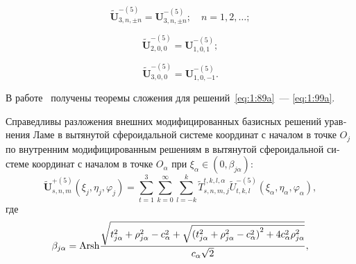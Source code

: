 \begin{russian}
\begin{equation}\label{eq:1:97a}
\mathbf{\tilde U}_{3,n,\pm n}^{-(5)}=\mathbf{U}_{3,n,\pm n}^{-(5)};\quad n=1,2,\dots;
\end{equation}

\begin{equation}\label{eq:1:98a}
\mathbf{\tilde U}_{2,0,0}^{-(5)}=\mathbf{U}_{1,0,1}^{-(5)};
\end{equation}

\begin{equation}\label{eq:1:99a}
\mathbf{\tilde U}_{3,0,0}^{-(5)}=\mathbf{U}_{1,0,-1}^{-(5)}.
\end{equation}

В работе~\cite{Nikolaev2014-1} получены теоремы сложения для решений~\eqref{eq:1:89a}~--- \eqref{eq:1:99a}.

\begin{theorem}
Справедливы разложения внешних модифицированных базисных решений уравнения Ламе в вытянутой сфероидальной системе координат с началом в точке $O_j$ по внутренним модифицированным решениям в вытянутой сфероидальной системе координат с началом в точке $O_\alpha$ при $\xi_\alpha\in(0,\beta_{j\alpha})$:
\begin{equation}
\mathbf{\tilde U}_{s,n,m}^{+(5)}(\xi_j,\eta_j,\varphi_j)=\sum\limits_{t=1}^3\sum\limits_{k=0}^\infty\sum\limits_{l=-k}^k\tilde T_{s,n,m,j}^{t,k,l,\alpha}\tilde U_{t,k,l}^{-(5)}(\xi_\alpha,\eta_\alpha,\varphi_\alpha),
\label{eq:1:100t}
\end{equation}
\noindent где
\begin{equation*}
\beta_{j\alpha}={\rm{Arsh}}\frac{{\sqrt {t_{j\alpha }^2 + \rho _{j\alpha }^2 - c_\alpha ^2 + \sqrt {{{(t_{j\alpha }^2 + \rho _{j\alpha }^2 - c_\alpha ^2)}^2} + 4c_\alpha ^2\rho _{j\alpha }^2} } }}{{{c_\alpha }\sqrt 2 }},
\end{equation*}


\end{theorem}
\end{russian}
